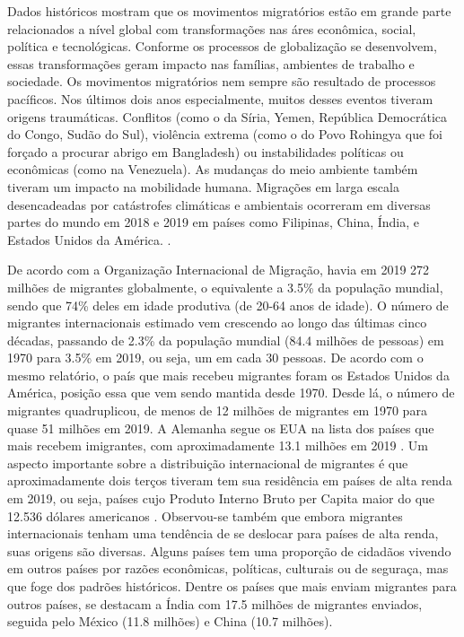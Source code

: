 \documentclass[
	12pt,				%
	openright,			%
	twoside,			%
	a4paper,			%
	english,			%
	french,				%
	spanish,			%
	brazil				%
	]{abntex2}
\begin{document}
Dados históricos mostram que os movimentos migratórios estão em grande parte relacionados a nível global com transformações nas áres econômica, social, política e tecnológicas. Conforme os processos de globalização se desenvolvem, essas transformações geram impacto nas famílias, ambientes de trabalho e sociedade. Os movimentos migratórios nem sempre são resultado de processos pacíficos. Nos últimos dois anos especialmente, muitos desses eventos tiveram origens traumáticas. Conflitos (como o da Síria, Yemen, República Democrática do Congo, Sudão do Sul), violência extrema (como o do Povo Rohingya que foi forçado a procurar abrigo em Bangladesh) ou instabilidades políticas ou econômicas (como na Venezuela). As mudanças do meio ambiente também tiveram um impacto na mobilidade humana. Migrações em larga escala desencadeadas por catástrofes climáticas e ambientais ocorreram em diversas partes do mundo em 2018 e 2019 em países como Filipinas, China, Índia, e Estados Unidos da América. \cite[19]{iom2020}.

De acordo com a Organização Internacional de Migração, havia em 2019 272 milhões de migrantes globalmente, o equivalente a 3.5\% da população mundial, sendo que 74\% deles em idade produtiva (de 20-64 anos de idade). O número de migrantes internacionais estimado vem crescendo ao longo das últimas cinco décadas, passando de 2.3\% da população mundial (84.4 milhões de pessoas) em 1970 para 3.5\% em 2019, ou seja, um em cada 30 pessoas. De acordo com o mesmo relatório, o país que mais recebeu migrantes foram os Estados Unidos da América, posição essa que vem sendo mantida desde 1970. Desde lá, o número de migrantes quadruplicou, de menos de 12 milhões de migrantes em 1970 para quase 51 milhões em 2019. A Alemanha segue os EUA na lista dos países que mais recebem imigrantes, com aproximadamente 13.1 milhões em 2019 \cite[21]{iom2020}. Um aspecto importante sobre a distribuição internacional de migrantes é que aproximadamente dois terços tiveram tem sua residência em países de alta renda em 2019, ou seja, países cujo Produto Interno Bruto per Capita maior do que 12.536 dólares americanos \cite{world_bank_country_lending_groups}. Observou-se também que embora migrantes internacionais tenham uma tendência de se deslocar para países de alta renda, suas origens são diversas. Alguns países tem uma proporção de cidadãos vivendo em outros países por razões econômicas, políticas, culturais ou de seguraça, mas que foge dos padrões históricos\cite[45]{iom2020}. Dentre os países que mais enviam migrantes para outros países, se destacam a Índia com 17.5 milhões de migrantes enviados, seguida pelo México (11.8 milhões) e China (10.7 milhões). 
\end{document}
